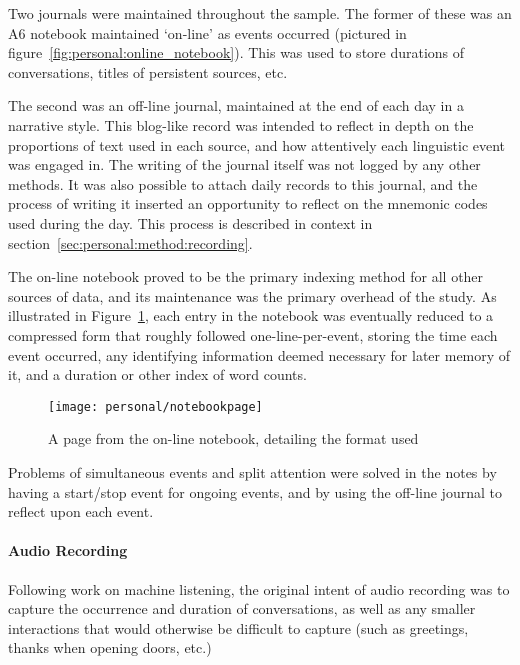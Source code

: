 Two journals were maintained throughout the sample.  The former of these was an A6 notebook maintained `on-line' as events occurred (pictured in figure~\ref{fig:personal:online_notebook}).  This was used to store durations of conversations, titles of persistent sources, etc.

The second was an off-line journal, maintained at the end of each day in a narrative style.  This blog-like record was intended to reflect in depth on the proportions of text used in each source, and how attentively each linguistic event was engaged in.  The writing of the journal itself was not logged by any other methods.  It was also possible to attach daily records to this journal, and the process of writing it inserted an opportunity to reflect on the mnemonic codes used during the day.  This process is described in context in section~\ref{sec:personal:method:recording}.

The on-line notebook proved to be the primary indexing method for all other sources of data, and its maintenance was the primary overhead of the study.  As illustrated in Figure~\ref{fig:personal:notebookformat}, each entry in the notebook was eventually reduced to a compressed form that roughly followed one-line-per-event, storing the time each event occurred, any identifying information deemed necessary for later memory of it, and a duration or other index of word counts.

\begin{figure}[p]
    \centering
    \texttt{[image: personal/notebookpage]}
    \caption{A page from the on-line notebook, detailing the format used}
    \label{fig:personal:notebookformat}
\end{figure}


Problems of simultaneous events and split attention were solved in the notes by having a start/stop event for ongoing events, and by using the off-line journal to reflect upon each event.

\paragraph{Audio Recording}
Following work on machine listening, the original intent of audio recording was to capture the occurrence and duration of conversations, as well as any smaller interactions that would otherwise be difficult to capture (such as greetings, thanks when opening doors, etc.)


